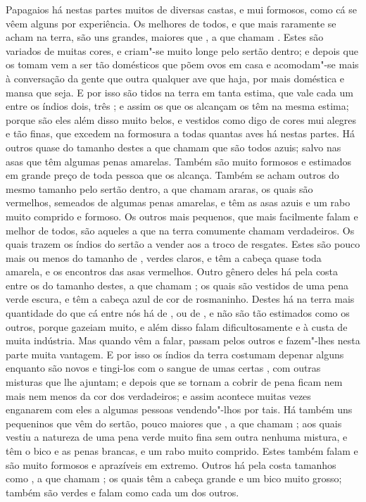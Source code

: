 Papagaios há nestas partes muitos de diversas castas, e mui formosos,			%
como cá se vêem alguns por experiência. Os melhores de todos, e que mais
raramente se acham na terra, são uns grandes, maiores que , a que
chamam . Estes  são variados de muitas cores, e
criam"-se  muito longe pelo sertão dentro; e depois que os tomam vem a
ser tão domésticos que põem ovos em casa e acomodam"-se mais à
conversação da gente que outra qualquer ave que haja, por mais
doméstica e mansa que seja. E por isso são tidos na terra em tanta
estima, que vale cada um entre os índios dois, três ; e assim os   	%
 que os alcançam os têm na mesma estima; porque são eles
além disso muito belos, e vestidos como digo de cores mui alegres e tão
finas, que excedem na formosura a todas quantas aves há nestas partes.
Há outros quase do tamanho destes a que chamam  que são todos
azuis; salvo nas asas que têm algumas penas amarelas. Também são muito
formosos e estimados em grande preço de toda pessoa que os alcança.
Também se acham outros do mesmo tamanho pelo sertão dentro, a que
chamam araras, os quais são vermelhos, semeados de algumas penas amarelas,		%
e têm as asas azuis e um rabo muito comprido e formoso. Os outros mais
pequenos, que mais facilmente falam e melhor de todos, são aqueles a
que na terra comumente chamam  verdadeiros. Os quais trazem os
índios do sertão a vender aos  a troco de resgates. Estes		%
são pouco mais ou menos do tamanho de , verdes claros, e têm a
cabeça quase toda amarela, e os encontros das asas vermelhos. Outro
gênero deles há pela costa entre os  do tamanho destes, a
que chamam ; os quais são vestidos de uma pena verde escura, e
têm a cabeça azul de cor de rosmaninho. Destes  há na terra
mais quantidade do que cá entre nós há de , ou de , e não
são tão estimados como os outros, porque gazeiam muito, e além disso
falam dificultosamente e à custa de muita indústria. Mas quando vêm a
falar, passam pelos outros e fazem"-lhes nesta parte muita vantagem. E
por isso os índios da terra costumam depenar alguns enquanto são novos e tingi-los com o sangue de umas certas , com			%
outras misturas que lhe ajuntam; e depois que se tornam a cobrir de
pena ficam nem mais nem menos da cor dos verdadeiros; e assim acontece
muitas vezes enganarem com eles a algumas pessoas vendendo"-lhos por
tais. Há também uns pequeninos que vêm do sertão, pouco maiores que
, a que chamam ; aos quais vestiu a natureza de uma pena
verde muito fina sem outra nenhuma mistura, e têm o bico e as penas
brancas, e um rabo muito comprido. Estes também falam e são muito
formosos e aprazíveis em extremo. Outros há pela costa tamanhos como
, a que chamam ; os quais têm a cabeça grande e um bico
muito grosso; também são verdes e falam como cada um dos \mbox{outros.}

